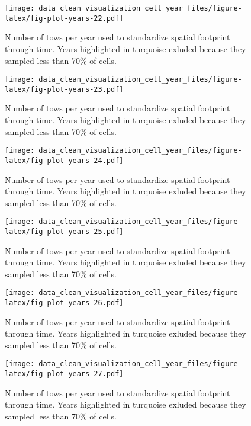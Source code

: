 \documentclass[
]{article}
\begin{document}
\begin{figure}
\centering
\texttt{[image: data\_clean\_visualization\_cell\_year\_files/figure-latex/fig-plot-years-22.pdf]}
\caption{\label{fig:fig-plot-years-22}Number of tows per year used to standardize spatial footprint through time. Years highlighted in turquoise exluded because they sampled less than 70\% of cells.}
\end{figure}

\begin{figure}
\centering
\texttt{[image: data\_clean\_visualization\_cell\_year\_files/figure-latex/fig-plot-years-23.pdf]}
\caption{\label{fig:fig-plot-years-23}Number of tows per year used to standardize spatial footprint through time. Years highlighted in turquoise exluded because they sampled less than 70\% of cells.}
\end{figure}

\begin{figure}
\centering
\texttt{[image: data\_clean\_visualization\_cell\_year\_files/figure-latex/fig-plot-years-24.pdf]}
\caption{\label{fig:fig-plot-years-24}Number of tows per year used to standardize spatial footprint through time. Years highlighted in turquoise exluded because they sampled less than 70\% of cells.}
\end{figure}

\begin{figure}
\centering
\texttt{[image: data\_clean\_visualization\_cell\_year\_files/figure-latex/fig-plot-years-25.pdf]}
\caption{\label{fig:fig-plot-years-25}Number of tows per year used to standardize spatial footprint through time. Years highlighted in turquoise exluded because they sampled less than 70\% of cells.}
\end{figure}

\begin{figure}
\centering
\texttt{[image: data\_clean\_visualization\_cell\_year\_files/figure-latex/fig-plot-years-26.pdf]}
\caption{\label{fig:fig-plot-years-26}Number of tows per year used to standardize spatial footprint through time. Years highlighted in turquoise exluded because they sampled less than 70\% of cells.}
\end{figure}

\begin{figure}
\centering
\texttt{[image: data\_clean\_visualization\_cell\_year\_files/figure-latex/fig-plot-years-27.pdf]}
\caption{\label{fig:fig-plot-years-27}Number of tows per year used to standardize spatial footprint through time. Years highlighted in turquoise exluded because they sampled less than 70\% of cells.}
\end{figure}
\end{document}
